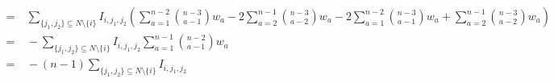 \begin{equation}
\begin{array}{rll}
        = & \ \sum\limits_{\{j_1,j_2\} \subseteq N \setminus \{i\}} I_{i,j_1,j_2} \left( \sum\limits_{a=1}^{n-2} \binom{n-3}{a-1} w_a - 2\sum\limits_{a=2}^{n-1} \binom{n-3}{a-2} w_a - 2\sum\limits_{a=1}^{n-2} \binom{n-3}{a-1} w_a + \sum\limits_{a=2}^{n-1} \binom{n-3}{a-2} w_a \right) \\
        = & \ - \sum\limits_{\{j_1,j_2\} \subseteq N \setminus \{i\}} I_{i,j_1,j_2} \sum\limits_{a=1}^{n-1} \binom{n-2}{a-1} w_a \\
        = & \ - (n-1) \sum\limits_{\{j_1,j_2\} \subseteq N \setminus \{i\}} I_{i,j_1,j_2}
	\end{array}
\end{equation}

